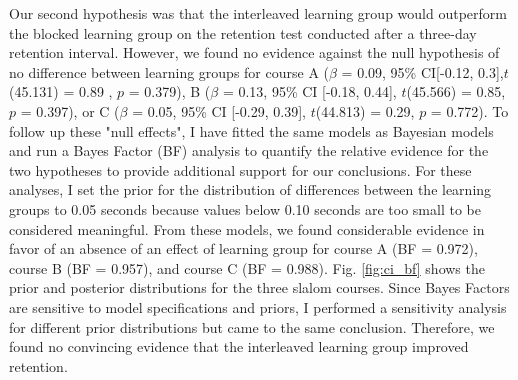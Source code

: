 Our second hypothesis was that the interleaved learning group would outperform the blocked learning group on the retention test conducted after a three-day retention interval. However, we found no evidence against the null hypothesis of no difference between learning groups for course A ($\beta$ = 0.09, 95\% CI[-0.12, 0.3],$t$(45.131) = 0.89 , $p$ = 0.379), B ($\beta$ = 0.13, 95\% CI [-0.18, 0.44], $t$(45.566) = 0.85, $p$ = 0.397), or C ($\beta$ = 0.05, 95\% CI [-0.29, 0.39], $t$(44.813) = 0.29, $p$ = 0.772). To follow up these "null effects", I have fitted the same models as Bayesian models and run a Bayes Factor (BF) analysis to quantify the relative evidence for the two hypotheses to provide additional support for our conclusions. For these analyses, I set the prior for the distribution of differences between the learning groups to 0.05 seconds because values below 0.10 seconds are too small to be considered meaningful. From these models, we found considerable evidence in favor of an absence of an effect of learning group for course A  (BF = 0.972), course B (BF = 0.957), and course C (BF = 0.988). Fig. \ref{fig:ci_bf} shows the prior and posterior distributions for the three slalom courses. Since Bayes Factors are sensitive to model specifications and priors, I performed a sensitivity analysis for different prior distributions but came to the same conclusion. Therefore, we found no convincing evidence that the interleaved learning group improved retention.

